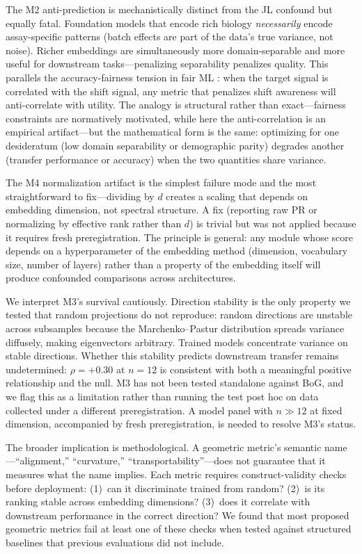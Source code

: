 \documentclass[9pt,lineno]{elife}
\begin{document}
The M2 anti-prediction is mechanistically distinct from the JL confound but equally fatal. Foundation models that encode rich biology \emph{necessarily} encode assay-specific patterns (batch effects are part of the data's true variance, not noise). Richer embeddings are simultaneously more domain-separable and more useful for downstream tasks---penalizing separability penalizes quality. This parallels the accuracy-fairness tension in fair ML \citep{chouldechova2017impossibility}: when the target signal is correlated with the shift signal, any metric that penalizes shift awareness will anti-correlate with utility. The analogy is structural rather than exact---fairness constraints are normatively motivated, while here the anti-correlation is an empirical artifact---but the mathematical form is the same: optimizing for one desideratum (low domain separability or demographic parity) degrades another (transfer performance or accuracy) when the two quantities share variance.

The M4 normalization artifact is the simplest failure mode and the most straightforward to fix---dividing by $d$ creates a scaling that depends on embedding dimension, not spectral structure. A fix (reporting raw PR or normalizing by effective rank rather than $d$) is trivial but was not applied because it requires fresh preregistration. The principle is general: any module whose score depends on a hyperparameter of the embedding method (dimension, vocabulary size, number of layers) rather than a property of the embedding itself will produce confounded comparisons across architectures.

We interpret M3's survival cautiously. Direction stability is the only property we tested that random projections do not reproduce: random directions are unstable across subsamples because the Marchenko--Pastur distribution spreads variance diffusely, making eigenvectors arbitrary. Trained models concentrate variance on stable directions. Whether this stability predicts downstream transfer remains undetermined: $\rho = +0.30$ at $n = 12$ is consistent with both a meaningful positive relationship and the null. M3 has not been tested standalone against BoG, and we flag this as a limitation rather than running the test post hoc on data collected under a different preregistration. A model panel with $n \gg 12$ at fixed dimension, accompanied by fresh preregistration, is needed to resolve M3's status.

The broader implication is methodological. A geometric metric's semantic name---``alignment,'' ``curvature,'' ``transportability''---does not guarantee that it measures what the name implies. Each metric requires construct-validity checks before deployment: (1)~can it discriminate trained from random? (2)~is its ranking stable across embedding dimensions? (3)~does it correlate with downstream performance in the correct direction? We found that most proposed geometric metrics fail at least one of these checks when tested against structured baselines that previous evaluations did not include.
\end{document}
